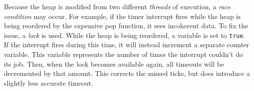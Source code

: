 Because the heap is modified from two different \emph{threads} of execution, a
\emph{race condition} may occur. For example, if the timer interrupt fires
while the heap is being reordered by the expensive pop function, it sees
incoherent data. To fix the issue, a \emph{lock} is used. While the heap is
being reordered, a variable is set to \texttt{true}. If the interrupt fires
during this time, it will instead increment a separate counter variable. This
variable represents the number of times the interrupt couldn't do its job.
Then, when the lock becomes available again, all timeouts will be decremented
by that amount. This corrects the missed ticks, but does introduce a slightly
less accurate timeout.
